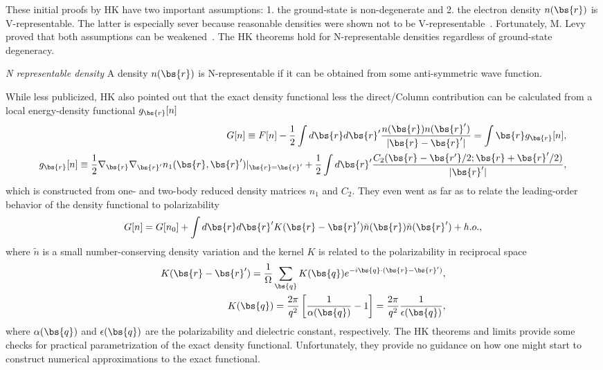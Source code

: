 These initial proofs by HK have two important assumptions: 1. the ground-state is non-degenerate and 2. the electron density $n(\bs{r})$ is V-representable. The latter is especially sever because reasonable densities were shown not to be V-representable~\cite{Levy1982,Lieb1983}. Fortunately, M. Levy proved that both assumptions can be weakened~\cite{Levy1979}. The HK theorems hold for N-representable densities regardless of ground-state degeneracy.
\begin{definition}
\textit{N representable density} A density $n(\bs{r})$ is N-representable if it can be obtained from some anti-symmetric wave function.
\end{definition}

While less publicized, HK also pointed out that the exact density functional less the direct/Column contribution can be calculated from a local energy-density functional $g_{\bs{r}}[n]$
\begin{align}
G[n]\equiv F[n]-\frac{1}{2}\int d\bs{r}d\bs{r}' \dfrac{n(\bs{r})n(\bs{r}')}{\vert\bs{r}-\bs{r}'\vert}=\int \bs{r} g_{\bs{r}}[n],\\
g_{\bs{r}}[n] \equiv \frac{1}{2}\nabla_{\bs{r}}\nabla_{\bs{r}'} n_1(\bs{r}, \bs{r}')\vert_{\bs{r}=\bs{r}'}+
\frac{1}{2}\int d\bs{r}' \dfrac{C_2(\bs{r}-\bs{r'}/2;\bs{r}+\bs{r}'/2)}{\vert\bs{r}'\vert},
\end{align}
which is constructed from one- and two-body reduced density matrices $n_1$ and $C_2$. They even went as far as to relate the leading-order behavior of the density functional to polarizability
\begin{align}
G[n] = G[n_0] + \int d\bs{r}d\bs{r}' K(\bs{r}-\bs{r}')\tilde{n}(\bs{r})\tilde{n}(\bs{r}')+h.o.,
\end{align}
where $\tilde{n}$ is a small number-conserving density variation and the kernel $K$ is related to the polarizability in reciprocal space
\begin{align}
K(\bs{r}-\bs{r}') = \dfrac{1}{\Omega}\sum\limits_{\bs{q}} K(\bs{q}) e^{-i\bs{q}\cdot(\bs{r}-\bs{r}')}, \\
K(\bs{q}) = \dfrac{2\pi}{q^2}\left[ \frac{1}{\alpha(\bs{q})}-1 \right] = \dfrac{2\pi}{q^2}\dfrac{1}{\epsilon(\bs{q})},
\end{align}
where $\alpha(\bs{q})$ and $\epsilon(\bs{q})$ are the polarizability and dielectric constant, respectively. The HK theorems and limits provide some checks for practical parametrization of the exact density functional. Unfortunately, they provide no guidance on how one might start to construct numerical approximations to the exact functional.

